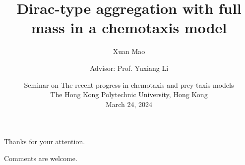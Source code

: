 \documentclass[10pt]{beamer}
\title{Dirac-type aggregation with full mass in a chemotaxis model}
\author{Xuan Mao\inst{1}\and
    Advisor: Prof. Yuxiang Li\inst{1}}
\institute{
    \inst{1}School of Mathematics, Southeast University, Nanjing
    }
\date{%
    Seminar on The recent progress in chemotaxis and prey-taxis models\\
    The Hong Kong Polytechnic University, Hong Kong\\
    March 24, 2024
    }
\theoremstyle{remark}
\begin{document}
\begin{frame}
\end{frame}










\begin{frame}[standout]
    Thanks for your attention.
    
    Comments are welcome.
\end{frame} 
\end{document}
